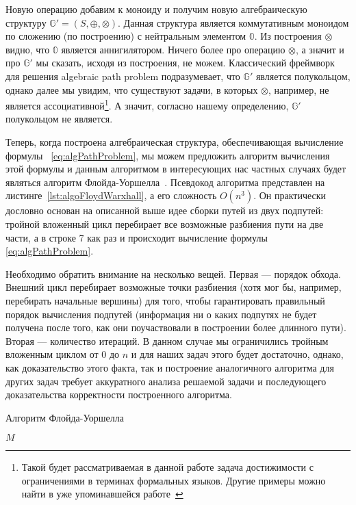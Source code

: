 Новую операцию добавим к моноиду и получим новую алгебраическую структуру $\mathbb{G}' = (S, \oplus,\otimes)$. Данная структура является коммутативным моноидом по сложению (по построению) с нейтральным элементом $\mathbb{0}$. Из построения $\otimes$ видно, что $\mathbb{0}$ является аннигилятором. Ничего более про операцию $\otimes$, а значит и про $\mathbb{G}'$ мы сказать, исходя из построения, не можем. Классический фреймворк для решения algebraic path problem подразумевает, что $\mathbb{G}'$ является полукольцом, однако далее мы увидим, что существуют задачи, в которых $\otimes$, например, не является ассоциативной\footnote{Такой будет рассматриваемая в данной работе задача достижимости с ограничениями в терминах формальных языков. Другие примеры можно найти в уже упоминавшейся работе~\cite{Baras2010PathPI}}. А значит, согласно нашему определению, $\mathbb{G}'$ полукольцом не является.

Теперь, когда построена алгебраическая структура, обеспечивающая вычисление формулы~
\ref{eq:algPathProblem}, мы можем предложить алгоритм вычисления этой формулы и данным алгоритмом в интересующих нас частных случаях будет являться алгоритм Флойда-Уоршелла~\cite{Floyd1962, Bernard1959, Warshall1962}. Псевдокод алгоритма представлен на листинге~\ref{lst:algoFloydWarxhall}, а его сложность $O(n^3)$. Он практически дословно основан на описанной выше идее сборки путей из двух подпутей: тройной вложенный цикл перебирает все возможные разбиения пути на две части, а в строке 7 как раз и происходит вычисление формулы~
\ref{eq:algPathProblem}.

Необходимо обратить внимание на несколько вещей. Первая --- порядок обхода. Внешний цикл перебирает возможные точки разбиения (хотя мог бы, например, перебирать начальные вершины) для того, чтобы гарантировать правильный порядок вычисления подпутей (информация ни о каких подпутях не будет получена после того, как они поучаствовали в построении более длинного пути). Вторая --- количество итераций. В данном случае мы ограничились тройным вложенным циклом от 0 до $n$ и для наших задач этого будет достаточно, однако, как доказательство этого факта, так и построение аналогичного алгоритма для других задач требует аккуратного анализа решаемой задачи и последующего доказательства корректности построенного алгоритма.

\begin{algorithm}
\begin{algorithmic}[1]
\caption{Алгоритм Флойда-Уоршелла}
\label{lst:algoFloydWarxhall}
        \EndFor
      \EndFor
    \EndFor
\State \Return $M$
\EndFunction
\end{algorithmic}
\end{algorithm}


